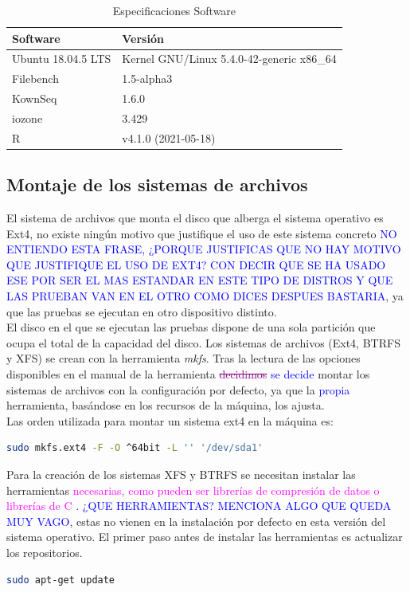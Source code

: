 \begin{table}[H]
    \centering
    \begin{tabular}{|l|l|}
    \hline
        Software & Versión \\ \hline\hline
        Ubuntu 18.04.5 LTS & Kernel GNU/Linux 5.4.0-42-generic x86\_64 \\ \hline
        Filebench & 1.5-alpha3 \\ \hline
        KownSeq & 1.6.0 \\ \hline
        iozone & 3.429 \\ \hline
        R & v4.1.0 (2021-05-18) \\ \hline
    \end{tabular}
    \caption{Especificaciones Software}
\label{table:2}
\end{table}

\subsection{Montaje de los sistemas de archivos}
El sistema de archivos que monta el disco que alberga el sistema operativo es Ext4, no existe ningún motivo que justifique el uso de este sistema concreto \textcolor{blue}{NO ENTIENDO ESTA FRASE, ¿PORQUE JUSTIFICAS QUE NO HAY MOTIVO QUE JUSTIFIQUE EL USO DE EXT4? CON DECIR QUE SE HA USADO ESE POR SER EL MAS ESTANDAR EN ESTE TIPO DE DISTROS Y QUE LAS PRUEBAN VAN EN EL OTRO COMO DICES DESPUES BASTARIA}, ya que las pruebas se ejecutan en otro dispositivo distinto. \\

El disco en el que se ejecutan las pruebas dispone de una sola partición que ocupa el total de la capacidad del disco. Los sistemas de archivos (Ext4, BTRFS y XFS) se crean con la herramienta \textit{mkfs}. Tras la lectura de las opciones disponibles en el manual de la herramienta \cite{tso} \textcolor{purple}{\sout{decidimos}} \textcolor{blue}{se decide} montar los sistemas de archivos con la configuración por defecto, ya que la \textcolor{blue}{propia} herramienta, basándose en los recursos de la máquina, los ajusta.\\

Las orden utilizada para montar un sistema ext4 en la máquina es:

\begin{lstlisting}[language=bash]
 sudo mkfs.ext4 -F -O ^64bit -L '' '/dev/sda1'
\end{lstlisting}

Para la creación de los sistemas XFS y BTRFS  se necesitan instalar las herramientas \textcolor{magenta}{necesarias, como pueden ser  librerías de compresión de datos o librerías de C \cite{lib-ubuntu-btrfs}}. \textcolor{blue}{¿QUE HERRAMIENTAS? MENCIONA ALGO QUE QUEDA MUY VAGO}, estas no vienen en la instalación por defecto en esta versión del sistema operativo. El primer paso antes de instalar las herramientas es actualizar los repositorios.
\begin{lstlisting}[language=bash]
sudo apt-get update
\end{lstlisting}

